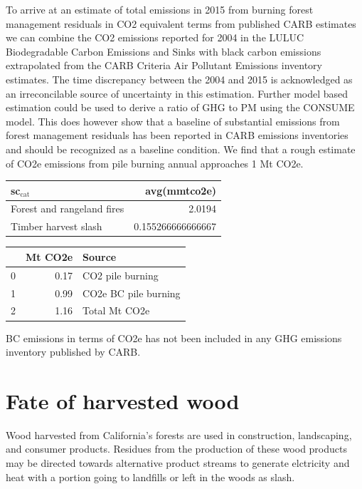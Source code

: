 \documentclass[a4paper]{article}
\begin{document}
To arrive at an estimate of total emissions in 2015 from burning forest
management residuals in CO2 equivalent terms from published CARB
estimates we can combine the CO2 emissions reported for 2004 in the
LULUC Biodegradable Carbon Emissions and Sinks with black carbon
emissions extrapolated from the CARB Criteria Air Pollutant Emissions
inventory estimates. The time discrepancy between the 2004 and 2015 is
acknowledged as an irreconcilable source of uncertainty in this
estimation. Further model based estimation could be used to derive a
ratio of GHG to PM using the CONSUME model. This does however show that a baseline of
substantial emissions from forest management residuals has been reported
in CARB emissions inventories and should be recognized as a baseline
condition. We find that a rough estimate of CO2e emissions from pile
burning annual approaches 1 Mt CO2e.

\begin{center}
\begin{tabular}{lr}
sc$_{\text{cat}}$ & avg(mmtco2e)\\
\hline
Forest and rangeland fires & 2.0194\\
Timber harvest slash & 0.155266666666667\\
\end{tabular}
\end{center}

\begin{center}
\begin{tabular}{rrl}
 & Mt CO2e & Source\\
\hline
0 & 0.17 & CO2 pile burning\\
1 & 0.99 & CO2e BC pile burning\\
2 & 1.16 & Total Mt CO2e\\
\end{tabular}
\end{center}

BC emissions in terms of CO2e has not been included in any GHG emissions
inventory published by CARB.


\section{Fate of harvested wood}
\label{sec-3}
Wood harvested from California's forests are used in construction,
landscaping, and consumer products. Residues from the
production of these wood products may be directed towards alternative product streams to generate elctricity and
heat with a portion going to landfills or left in the
woods as slash.
\end{document}
